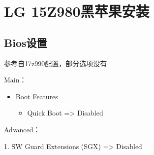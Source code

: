 \documentclass[lang=cn,12pt,chinesefont=founder]{elegantbook}
\begin{document}
\chapter{LG 15Z980黑苹果安装}

\section{Bios设置}

参考自17z990配置，部分选项没有 

Main：
    \begin{itemize}
        \item Boot Features
            \begin{itemize}
            \item Quick Boot => Disabled
            \end{itemize}
    \end{itemize}

Advanced：

1. SW Guard Extensions (SGX) => Disabled
\end{document}
